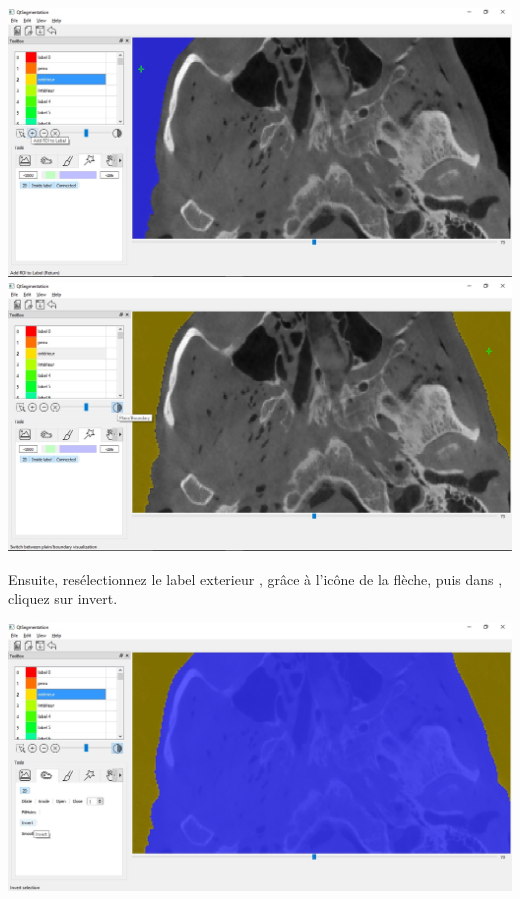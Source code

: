 \documentclass {article}
\begin{document}
\begin{center}
\includegraphics[scale=0.5]{Iconographie/Exemple_1_1.jpg}
\includegraphics[scale=0.5]{Iconographie/Exemple_1_2.jpg}
\end{center}

Ensuite, resélectionnez le label \og exterieur \fg , grâce à l'icône de la flèche, puis dans , cliquez sur invert. 

\begin{center}
\includegraphics[scale=0.5]{Iconographie/Exemple_1_3.jpg}
\end{center}
\end{document}
